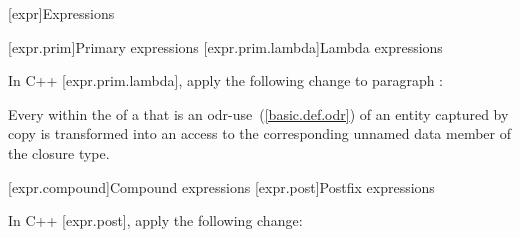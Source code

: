 [expr]{Expressions}

\setcounter{section}{3}
[expr.prim]{Primary expressions}
\setcounter{subsection}{4}
[expr.prim.lambda]{Lambda expressions}

\pnum
In C++ [expr.prim.lambda], apply the following change to paragraph :

\begin{std.txt}
Every  within the  of a  that is an odr-use~(\ref{basic.def.odr}) of an entity captured by copy is transformed into an access to the corresponding unnamed data member of the closure type.
\end{std.txt}

[expr.compound]{Compound expressions}
[expr.post]{Postfix expressions}

\pnum
In C++ [expr.post], apply the following change:

